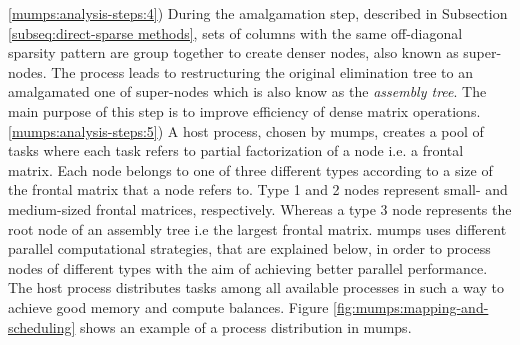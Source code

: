 


\ref{mumps:analysis-steps:4}) During the  amalgamation step, described in Subsection \ref{subseq:direct-sparse methods}, sets of columns with the same off-diagonal sparsity pattern are group together to create denser nodes, also known as super-nodes. The process leads to restructuring the original elimination tree to an amalgamated one of super-nodes which is also know as the \textit{assembly tree}. The main purpose of this step is to improve efficiency of dense matrix operations.\\




\ref{mumps:analysis-steps:5}) A host process, chosen by \acrshort{mumps}, creates a pool of tasks where each task refers to partial factorization of a node i.e. a frontal matrix. Each node belongs to one of three different types according to a size of the frontal matrix that a node refers to. Type 1 and 2 nodes represent small- and medium-sized frontal matrices, respectively. Whereas a type 3 node  represents the root node of an assembly tree i.e the largest frontal matrix. \acrshort{mumps} uses different parallel computational strategies, that are explained below, in order to process nodes of different types with the aim of achieving better parallel performance. The host process distributes tasks among all available processes in such a way to achieve good memory and compute balances. Figure \ref{fig:mumps:mapping-and-scheduling} shows an example of a process distribution in \acrshort{mumps}.\\


